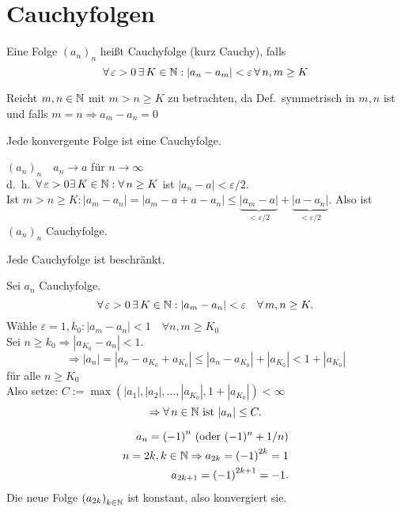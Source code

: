 \documentclass[../ana1.tex]{subfiles}
\begin{document}
\setcounter{section}{8}

\section{Cauchyfolgen}
\begin{defi}[Cauchyfolge]
	Eine Folge \({(a_n)}_n\) heißt Cauchyfolge (kurz Cauchy), falls
	\[\forall \varepsilon > 0 \,\exists K\in\N: |a_n-a_m| < \varepsilon \, \forall n,m\geq K \]
\end{defi}
\begin{bem}
	Reicht \(m,n\in\mathbb{N} \) mit \( m>n\geq K \) zu betrachten, da Def.\ symmetrisch in \(m,n\) ist und falls \(m=n \Rightarrow a_m-a_n=0\)
\end{bem}
\begin{lem}
	Jede konvergente Folge ist eine Cauchyfolge.
\end{lem}
\begin{bew}
	\( {(a_n)}_n \quad a_n \rightarrow a \) für \(n\rightarrow\infty \) \\
	d.\ h.\  \( \forall \varepsilon > 0 \exists K \in \N: \forall n\geq K \) ist \( |a_n-a| < \varepsilon/2 \).\\
	Ist \(m>n\geq K: |a_m -a_n| = |a_m-a+a-a_n| \leq \underbrace{|a_m-a|}_{<\varepsilon/2} + \underbrace{ |a-a_n| }_{<\varepsilon/2}. \) Also ist \({(a_n)}_n\) Cauchyfolge.
\end{bew}
\begin{lem}
	Jede Cauchyfolge ist beschränkt.
\end{lem}
\begin{bew}
	Sei \(a_n\) Cauchyfolge. 
	\[ \forall \varepsilon > 0 \, \exists K\in\N:|a_m-a_n| < \varepsilon \quad \forall m,n\geq K. \]
	Wähle \(\varepsilon = 1, k_0: |a_m-a_n| < 1 \quad \forall n,m\geq K_0 \) \\
	Sei \(n \geq k_0 \Rightarrow |a_{K_0} - a_n| < 1. \)
	\[ \Rightarrow |a_n| = |a_n - a_{K_0} + a_{K_0}| \leq |a_n - a_{K_0}| + |a_{K_0}| < 1 + |a_{K_0}| \] für alle \(n\geq K_0\) \\
	Also setze: \( C := \max ( |a_1|,|a_2|,\ldots,|a_{K_0}|,1+|a_{K_0}| ) < \infty \) 
	\[ \Rightarrow \forall n\in\N \text{ ist } |a_n| \leq C. \]
\end{bew}
\begin{bsp}
	\begin{align*}
		a_n = {(-1)}^n \text{ (oder } (-1)^n + 1/n \text{)} \\
		n = 2k, k\in\mathbb{N} \Rightarrow a_{2k} = {(-1)}^{2k} = 1 \\
		a_{2k+1} = {(-1)}^{2k+1} = -1.
	\end{align*}
	Die neue Folge \( {(a_{2k})}_{k\in\mathbb{N}} \) ist konstant, also konvergiert sie.
\end{bsp}
\end{document}
